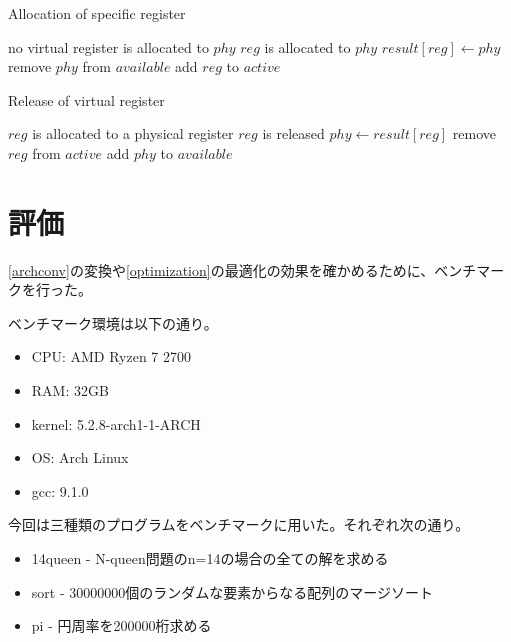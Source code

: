 \documentclass[uplatex,a4paper]{jsarticle}
\begin{document}
\begin{algorithm}
\caption{Allocation of specific register}\label{algallocreg}
\begin{algorithmic}[1]
  \Require no virtual register is allocated to $phy$
  \Ensure $reg$ is allocated to $phy$
  \State $result[reg] \gets phy$
  \State remove $phy$ from $available$
  \State add $reg$ to $active$ 
\EndProcedure
\end{algorithmic}
\end{algorithm}

\begin{algorithm}
\caption{Release of virtual register}\label{algreleasereg}
\begin{algorithmic}[1]
  \Require $reg$ is allocated to a physical register
  \Ensure $reg$ is released
  \State $phy \gets result[reg]$
  \State remove $reg$ from $active$
  \State add $phy$ to $available$ 
  \EndProcedure
\end{algorithmic}
\end{algorithm}

\clearpage
\section{評価}
\label{ccc_performance}

\cref{archconv}の変換や\cref{optimization}の最適化の効果を確かめるために、ベンチマークを行った。

ベンチマーク環境は以下の通り。
\begin{itemize}
  \item CPU: AMD Ryzen 7 2700
  \item RAM: 32GB
  \item kernel: 5.2.8-arch1-1-ARCH
  \item OS: Arch Linux
  \item gcc: 9.1.0
\end{itemize}

今回は三種類のプログラムをベンチマークに用いた。それぞれ次の通り。
\begin{itemize}
  \item 14queen - N-queen問題のn=14の場合の全ての解を求める
  \item sort - 30000000個のランダムな要素からなる配列のマージソート
  \item pi - 円周率を200000桁求める
\end{itemize}
\end{document}
